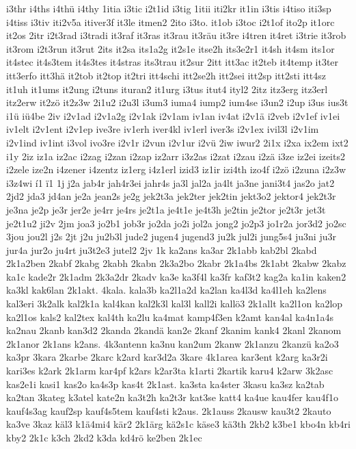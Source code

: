 {i3thr
i4ths
i4thü
i4thy
1itia
i3tic
i2t1id
i3tig
1itii
iti2kr
it1in
i3tis
i4tiso
iti3sp
i4tiss
i3tiv
iti2v5a
itiver3f
it3le
itmen2
2ito
i3to.
it1ob
i3toc
i2t1of
ito2p
it1orc
it2os
2itr
i2t3rad
i3tradi
it3raf
it3ras
it3rau
it3räu
it3re
i4tren
it4ret
i3trie
it3rob
it3rom
i2t3run
it3rut
2its
it2sa
its1a2g
it2s1e
itse2h
its3e2r1
it4sh
it4sm
its1or
it4stec
it4s3tem
it4s3tes
it4stras
its3trau
it2sur
2itt
itt3ac
it2teb
it4temp
it3ter
itt3erfo
itt3hä
it2tob
it2top
it2tri
itt4schi
itt2se2h
itt2sei
itt2sp
itt2sti
itt4sz
it1uh
it1ums
it2ung
i2tuns
ituran2
it1urg
i3tus
itut4
ityl2
2itz
itz3erg
itz3erl
itz2erw
it2zö
it2z3w
2i1u2
i2u3l
i3um3
iuma4
iump2
ium4se
i3un2
i2up
i3us
ius3t
i1ü
iü4be
2iv
i2v1ad
i2v1a2g
i2v1ak
i2v1am
iv1an
iv4at
i2v1ä
i2veb
i2v1ef
iv1ei
iv1elt
i2v1ent
i2v1ep
ive3re
iv1erh
iver4kl
iv1erl
iver3s
i2v1ex
ivil3l
i2v1im
i2v1ind
iv1int
i3vol
ivo3re
i2v1r
i2vun
i2v1ur
i2vü
2iw
iwur2
2i1x
i2xa
ix2em
ixt2
i1y
2iz
iz1a
iz2ac
i2zag
i2zan
i2zap
iz2arr
i3z2as
i2zat
i2zau
i2zä
i3ze
iz2ei
izeits2
i2zele
ize2n
i4zener
i4zentz
iz1erg
i4z1erl
izid3
iz1ir
izi4th
izo4f
i2zö
i2zuna
i2z3w
i3z4wi
í1
ï1
1j
j2a
jab4r
jah4r3ei
jahr4s
ja3l
jal2a
ja4lt
ja3ne
jani3t4
jas2o
jat2
2jd2
jda3
jd4an
je2a
jean2s
je2g
jek2t3a
jek2ter
jek2tin
jekt3o2
jektor4
jek2t3r
je3na
je2p
je3r
jer2e
je4rr
je4rs
je2t1a
je4t1e
je4t3h
je2tin
je2tor
je2t3r
jet3t
je2t1u2
ji2v
2jm
joa3
jo2b1
job3r
jo2da
jo2i
jol2a
jong2
jo2p3
jo1r2a
jor3d2
jo2sc
3jou
jou2l
j2s
2jt
j2u
ju2b3l
jude2
jugen4
jugend3
ju2k
jul2i
jung5s4
ju3ni
ju3r
jur4a
jur2o
ju4rt
ju3t2e3
jutel2
2jv
1k
ka2ans
ka3ar
2k1abb
kab2bl
2kabd
2k1a2ben
2kabf
2kabg
2kabh
2kabn
2k3a2bo
2kabr
2k1a4bs
2k1abt
2kabw
2kabz
ka1c
kade2r
2k1adm
2k3a2dr
2kadv
ka3e
ka3f4l
ka3fr
kaf3t2
kag2a
ka1in
kaken2
ka3kl
kak6lan
2k1akt.
4kala.
kala3b
ka2l1a2d
ka2lan
ka4l3d
ka4l1eh
ka2lens
kal3eri
3k2alk
kal2k1a
kal4kan
kal2k3l
kal3l
kall2i
kallö3
2k1allt
ka2l1on
ka2lop
ka2l1os
kals2
kal2tex
kal4th
ka2lu
ka4mat
kamp4f3en
k2amt
kan4al
ka4n1a4s
ka2nau
2kanb
kan3d2
2kanda
2kandä
kan2e
2kanf
2kanim
kank4
2kanl
2kanom
2k1anor
2k1ans
k2ans.
4k3antenn
ka3nu
kan2um
2kanw
2k1anzu
2kanzü
ka2o3
ka3pr
3kara
2karbe
2karc
k2ard
kar3d2a
3kare
4k1area
kar3ent
k2arg
ka3r2i
kari3es
k2ark
2k1arm
kar4pf
k2ars
k2ar3ta
k1arti
2kartik
karu4
k2arw
3k2asc
kas2e1i
kasi1
kas2o
ka4s3p
kas4t
2k1ast.
ka3sta
ka4ster
3kasu
ka3sz
ka2tab
ka2tan
3kateg
k3atel
kate2n
ka3t2h
ka2t3r
kat3se
katt4
ka4ue
kau4fer
kau4f1o
kauf4s3ag
kauf2sp
kauf4s5tem
kauf4sti
k2aus.
2k1auss
2kausw
kau3t2
2kauto
ka3ve
3kaz
käl3
k1ä4mi4
kär2
2k1ärg
kä2s1c
käse3
kä3th
2kb2
k3be1
kbo4n
kb4ri
kby2
2k1c
k3ch
2kd2
k3da
kd4rö
ke2ben
2k1ec
}
